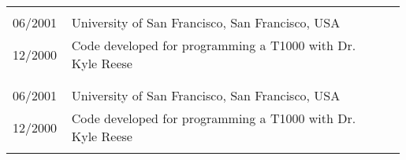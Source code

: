 \documentclass[11pt, letterpaper]{extarticle}
\begin{document}
	\begin{longtable}{C{0.154\linewidth}C{0.834\linewidth}N}
		                                                             &                                                                                                                                                                                                                                                  & \\[-0.25cm]
		06/2001                                                      & University of San Francisco, San Francisco, USA                                                                                                                                                                                                  & \\
		12/2000                                                      & Code developed for programming a T1000 with Dr. Kyle Reese                                                                                                                                                                                       & \\
		                                                             &                                                                                                                                                                                                                                                  & \\[-0.25cm]
		                                                             &                                                                                                                                                                                                                                                  & \\[-0.25cm]
		06/2001                                                      & University of San Francisco, San Francisco, USA                                                                                                                                                                                                  & \\
		12/2000                                                      & Code developed for programming a T1000 with Dr. Kyle Reese                                                                                                                                                                                       & \\
		                                                             &                                                                                                                                                                                                                                                  & \\[-0.25cm]
		\hline
	\end{longtable}
\end{document}
